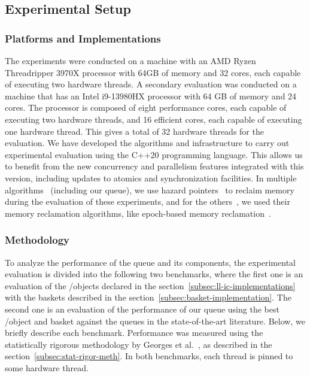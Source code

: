 \subsection{\label{subsec:queue-experimental-setup}Experimental Setup}
\subsubsection{Platforms and Implementations}

The experiments were conducted on a machine with an AMD Ryzen Threadripper 3970X processor with 64GB of memory and 32 cores, each capable of executing two hardware threads. A secondary evaluation was conducted on a machine that has an Intel i9-13980HX processor with 64 GB of memory and 24 cores. The processor is composed of eight performance cores, each capable of executing two hardware threads, and 16 efficient cores, each capable of executing one hardware thread. This gives a total of 32 hardware threads for the evaluation. We have developed the algorithms and infrastructure to carry out experimental evaluation using the C++20 programming language. This allows us to benefit from the new concurrency and parallelism features integrated with this version, including updates to atomics and synchronization facilities. In multiple algorithms~\cite{ DBLP_conf_podc_MichaelS96,ppopp2013x86queues, Ramalhete_Correia_MPMC_2016} (including our queue), we use hazard pointers~\cite{DBLP_conf_podc_Michael02} to reclaim memory during the evaluation of these experiments, and for the others~\cite{scalingconcurrent2020, DBLP_conf_ppopp_YangM16}, we used their memory reclamation algorithms, like epoch-based memory reclamation~\cite{DBLP_phd_ethos_Fraser04,mckenney2001read}.

\subsubsection{\label{subsubsec:queues-experiment-methodology}Methodology}

To analyze the performance of the queue and its components, the experimental evaluation is divided into the following two benchmarks, where the first one is an evaluation of the \LL/\IC objects declared in the section~\ref{subsec:ll-ic-implementations} with the baskets described in the section~\ref{subsec:basket-implementation}. The second one is an evaluation of the performance of our queue using the best \LL/\IC object and basket against the queues in the state-of-the-art literature. Below, we briefly describe each benchmark. Performance was measured using the statistically rigorous methodology by Georges et al.~\cite{DBLP_conf_oopsla_GeorgesBE07}, as described in the section~\ref{subsec:stat-rigor-meth}. In both benchmarks, each thread is pinned to some hardware thread.

